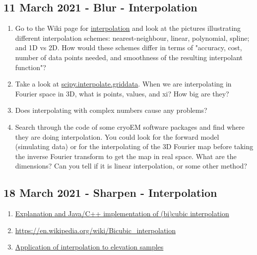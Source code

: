 \documentclass[11pt, oneside]{article}   	%
\begin{document}
\subsection{11 March 2021 - Blur - Interpolation}

\begin{enumerate}
	\item Go to the Wiki page for \href{https://en.wikipedia.org/wiki/Interpolation}{interpolation} and look at the pictures illustrating different interpolation schemes: nearest-neighbour, linear, polynomial, spline; and 1D vs 2D. How would these schemes differ in terms of "accuracy, cost, number of data points needed, and smoothness of the resulting interpolant function"?
	\item Take a look at \href{https://docs.scipy.org/doc/scipy/reference/generated/scipy.interpolate.griddata.html}{scipy.interpolate.griddata}. When we are interpolating in Fourier space in 3D, what is points, values, and xi? How big are they?
	\item Does interpolating with complex numbers cause any problems?
	\item Search through the code of some cryoEM software packages and find where they are doing interpolation. You could look for the forward model (simulating data) or for the interpolating of the 3D Fourier map before taking the inverse Fourier transform to get the map in real space. What are the dimensions? Can you tell if it is linear interpolation, or some other method?
\end{enumerate}

\subsection{18 March 2021 - Sharpen - Interpolation}
\begin{enumerate}
	\item \href{https://www.paulinternet.nl/?page=bicubic}{Explanation and Java/C++ implementation of (bi)cubic interpolation}
	\item \url{https://en.wikipedia.org/wiki/Bicubic_interpolation}
	\item \href{https://web.archive.org/web/20051024202307/http://www.geovista.psu.edu/sites/geocomp99/Gc99/082/gc_082.htm}{Application of interpolation to elevation samples}
\end{enumerate}
\end{document}
